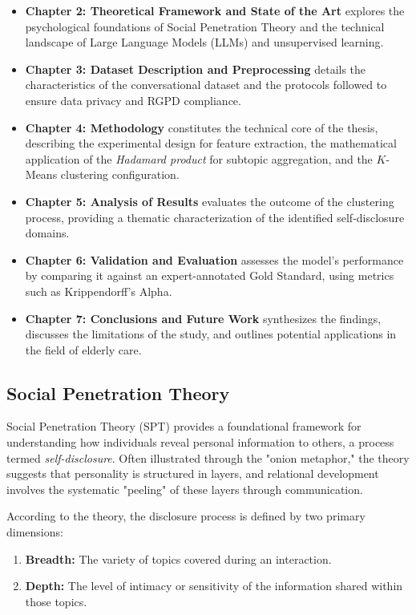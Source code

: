 \begin{itemize}
    \item \textbf{Chapter 2: Theoretical Framework and State of the Art} explores the psychological foundations of Social Penetration Theory and the technical landscape of Large Language Models (LLMs) and unsupervised learning.
    
    \item \textbf{Chapter 3: Dataset Description and Preprocessing} details the characteristics of the conversational dataset and the protocols followed to ensure data privacy and RGPD compliance.
    
    \item \textbf{Chapter 4: Methodology} constitutes the technical core of the thesis, describing the experimental design for feature extraction, the mathematical application of the \textit{Hadamard product} for subtopic aggregation, and the $K$-Means clustering configuration.
    
    \item \textbf{Chapter 5: Analysis of Results} evaluates the outcome of the clustering process, providing a thematic characterization of the identified self-disclosure domains.
    
    \item \textbf{Chapter 6: Validation and Evaluation} assesses the model's performance by comparing it against an expert-annotated Gold Standard, using metrics such as Krippendorff’s Alpha.
    
    \item \textbf{Chapter 7: Conclusions and Future Work} synthesizes the findings, discusses the limitations of the study, and outlines potential applications in the field of elderly care.
\end{itemize}


\subsection{Social Penetration Theory}


Social Penetration Theory (SPT) provides a foundational framework for understanding how individuals reveal personal information to others, a process termed \textit{self-disclosure}. Often illustrated through the "onion metaphor," the theory suggests that personality is structured in layers, and relational development involves the systematic "peeling" of these layers through communication.

According to the theory, the disclosure process is defined by two primary dimensions:
\begin{enumerate}
    \item \textbf{Breadth:} The variety of topics covered during an interaction.
    \item \textbf{Depth:} The level of intimacy or sensitivity of the information shared within those topics.
\end{enumerate}

